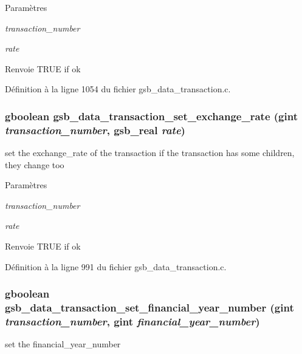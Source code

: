 \begin{DoxyParams}{Paramètres}
\item[{\em transaction\_\-number}]\item[{\em rate}]\end{DoxyParams}
\begin{DoxyReturn}{Renvoie}
TRUE if ok 
\end{DoxyReturn}


Définition à la ligne 1054 du fichier gsb\_\-data\_\-transaction.c.

\subsubsection[{gsb\_\-data\_\-transaction\_\-set\_\-exchange\_\-rate}]{\setlength{\rightskip}{0pt plus 5cm}gboolean gsb\_\-data\_\-transaction\_\-set\_\-exchange\_\-rate (gint {\em transaction\_\-number}, \/  {\bf gsb\_\-real} {\em rate})}\label{gsb__data__transaction_8h_ab820052bef3b75398e7a95f5ff25574d}
set the exchange\_\-rate of the transaction if the transaction has some children, they change too


\begin{DoxyParams}{Paramètres}
\item[{\em transaction\_\-number}]\item[{\em rate}]\end{DoxyParams}
\begin{DoxyReturn}{Renvoie}
TRUE if ok 
\end{DoxyReturn}


Définition à la ligne 991 du fichier gsb\_\-data\_\-transaction.c.

\subsubsection[{gsb\_\-data\_\-transaction\_\-set\_\-financial\_\-year\_\-number}]{\setlength{\rightskip}{0pt plus 5cm}gboolean gsb\_\-data\_\-transaction\_\-set\_\-financial\_\-year\_\-number (gint {\em transaction\_\-number}, \/  gint {\em financial\_\-year\_\-number})}\label{gsb__data__transaction_8h_a305e4bd347a0b42e2a5379b4c109d5b2}
set the financial\_\-year\_\-number


